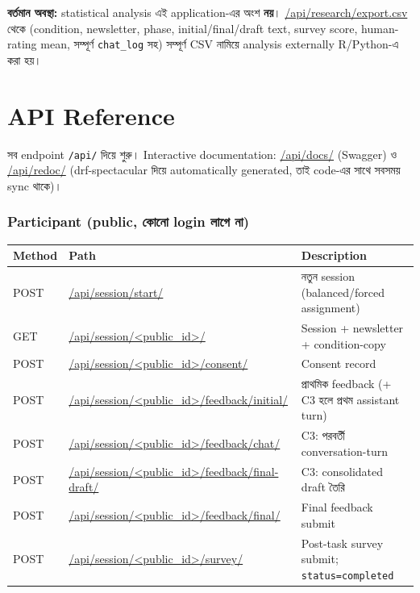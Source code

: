 \documentclass[11pt,a4paper]{article}
\newcommand{\code}[1]{\texttt{\small #1}}
\newcommand{\pathcode}[1]{{\small\url{#1}}}
\begin{document}
\textbf{বর্তমান অবস্থা:} statistical analysis এই application-এর অংশ \textbf{নয়}।
\pathcode{/api/research/export.csv} থেকে (condition, newsletter, phase, initial/final/draft
text, survey score, human-rating mean, সম্পূর্ণ \code{chat\_log} সহ) সম্পূর্ণ CSV নামিয়ে
analysis externally R/Python-এ করা হয়।

\newpage
\section{API Reference}

সব endpoint \code{/api/} দিয়ে শুরু। Interactive documentation: \url{/api/docs/} (Swagger)
ও \url{/api/redoc/} (drf-spectacular দিয়ে automatically generated, তাই code-এর সাথে সবসময়
sync থাকে)।

\subsubsection*{Participant (public, কোনো login লাগে না)}
\begin{longtable}{@{}p{1.7cm}p{6.9cm}p{7.4cm}@{}}
\toprule
\textbf{Method} & \textbf{Path} & \textbf{Description} \\
\midrule
\endhead
POST & \url{/api/session/start/} & নতুন session (balanced/forced assignment) \\
GET & \url{/api/session/<public_id>/} & Session \;+\; newsletter \;+\; condition-copy \\
POST & \url{/api/session/<public_id>/consent/} & Consent record \\
POST & \url{/api/session/<public_id>/feedback/initial/} & প্রাথমিক feedback (\;+\; C3 হলে
  প্রথম assistant turn) \\
POST & \url{/api/session/<public_id>/feedback/chat/} & C3: পরবর্তী conversation-turn \\
POST & \url{/api/session/<public_id>/feedback/final-draft/} & C3: consolidated draft তৈরি \\
POST & \url{/api/session/<public_id>/feedback/final/} & Final feedback submit \\
POST & \url{/api/session/<public_id>/survey/} & Post-task survey submit; \code{status=completed} \\
\bottomrule
\end{longtable}
\end{document}
